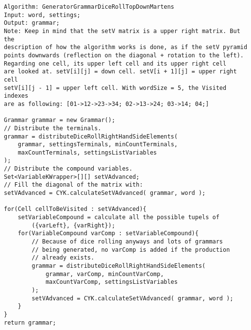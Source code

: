 \lstset{language=java}
\begin{lstlisting}[frame=htrbl,caption={GeneratorGrammarDiceRollTopDownMartens}, 
label={lst:GeneratorGrammarDiceRollTopDownMartens}]
Algorithm: GeneratorGrammarDiceRollTopDownMartens
Input: word, settings;
Output: grammar;
Note: Keep in mind that the setV matrix is a upper right matrix. But the
description of how the algorithm works is done, as if the setV pyramid 
points downwards (reflection on the diagonal + rotation to the left).
Regarding one cell, its upper left cell and its upper right cell 
are looked at. setV[i][j] = down cell. setV[i + 1][j] = upper right cell
setV[i][j - 1] = upper left cell. With wordSize = 5, the Visited indexes 
are as following: [01->12->23->34; 02->13->24; 03->14; 04;]

Grammar grammar = new Grammar();
// Distribute the terminals.
grammar = distributeDiceRollRightHandSideElements(
	grammar, settingsTerminals, minCountTerminals, 
	maxCountTerminals, settingsListVariables
);
// Distribute the compound variables.
Set<VariableKWrapper>[][] setVAdvanced;
// Fill the diagonal of the matrix with:
setVAdvanced = CYK.calculateSetVAdvanced( grammar, word );

for(Cell cellToBeVisited : setVAdvanced){
	setVariableCompound = calculate all the possible tupels of 
		({varLeft}, {varRight});
	for(VariableCompound varComp : setVariableCompound){
		// Because of dice rolling anyways and lots of grammars 
		// being generated, no varComp is added if the production
		// already exists.
		grammar = distributeDiceRollRightHandSideElements(
			grammar, varComp, minCountVarComp, 
			maxCountVarComp, settingsListVariables
		);
		setVAdvanced = CYK.calculateSetVAdvanced( grammar, word );
	}
}
return grammar;
\end{lstlisting}
\pagebreak